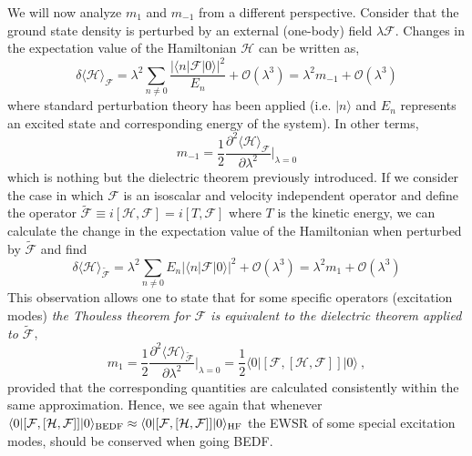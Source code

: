 \documentclass[12pt,a4paper,final]{iopart}
\begin{document}
We will now analyze $m_1$ and $m_{-1}$ from a different perspective. Consider that the ground state density is perturbed by an external (one-body) field $\lambda \mathcal{F}$. Changes in the expectation value of the Hamiltonian $\mathcal{H}$ can be written as,
\begin{equation}  
\delta\langle\mathcal{H}\rangle_{\mathcal{F}} = \lambda^2\sum_{n\neq 0}\frac{\vert\langle n\vert\mathcal{F}\vert 0\rangle\vert^2}{E_n} + \mathcal{O}(\lambda^3) = \lambda^2 m_{-1} + \mathcal{O}(\lambda^3)
\end{equation}
where standard perturbation theory has been applied (i.e. $\vert n\rangle$ and $E_n$ represents an excited state and corresponding energy of the system).
In other terms, 
\begin{equation}  
m_{-1} = \frac{1}{2}\frac{\partial^2\langle\mathcal{H}\rangle_{\mathcal{F}}}{\partial \lambda^2}\Big\vert_{\lambda=0}
\end{equation}
which is nothing but the dielectric theorem \cite{bohigas1979} previously introduced. If we consider the case in which $\mathcal{F}$ is an isoscalar and velocity independent operator and define the operator $\tilde{\mathcal{F}}\equiv i[\mathcal{H},\mathcal{F}] = i[T,\mathcal{F}]$ where $T$ is the kinetic energy, we can calculate the change in the expectation value of the Hamiltonian when perturbed by $\tilde{\mathcal{F}}$ and find
\begin{equation}  
\delta\langle\mathcal{H}\rangle_{\tilde{\mathcal{F}}} = \lambda^2\sum_{n\neq 0} E_n \vert\langle n\vert\mathcal{F}\vert 0\rangle\vert^2 + \mathcal{O}(\lambda^3) = \lambda^2 m_1 + \mathcal{O}(\lambda^3)
\end{equation}
This observation \cite{bohigas1979} allows one to state that for some specific operators (excitation modes) {\it the Thouless theorem for $\mathcal{F}$ is equivalent to the dielectric theorem applied to $\tilde{\mathcal{F}}$}, 
\begin{equation}  
m_1 = \frac{1}{2}\frac{\partial^2\langle\mathcal{H}\rangle_{\tilde{\mathcal{F}}}}{\partial \lambda^2}\Big\vert_{\lambda=0} = \frac{1}{2}\langle 0\vert [\mathcal{F},[\mathcal{H},\mathcal{F}]]\vert 0\rangle \ ,
\label{m1}
\end{equation}
provided that the corresponding quantities are calculated consistently within the same approximation. Hence, we see again that whenever $\langle 0\vert [\mathcal{F},[\mathcal{H},\mathcal{F}]]\vert 0\rangle_{\rm BEDF}\approx \langle 0\vert [\mathcal{F},[\mathcal{H},\mathcal{F}]]\vert 0\rangle_{\rm HF}$ the EWSR of some special excitation modes, should be conserved when going BEDF.
\end{document}

